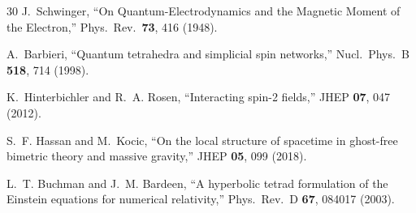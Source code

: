 \documentclass[aps,prd,preprint,superscriptaddress,showpacs,preprintnumbers,amsmath,amssymb,nofootinbib]{revtex4-2}
\begin{document}
\begin{thebibliography}{30}
J.~Schwinger, ``On Quantum-Electrodynamics and the Magnetic Moment of the Electron,'' Phys.\ Rev.\ \textbf{73}, 416 (1948).

A.~Barbieri, ``Quantum tetrahedra and simplicial spin networks,'' Nucl.\ Phys.\ B \textbf{518}, 714 (1998).

K.~Hinterbichler and R.~A. Rosen, ``Interacting spin-2 fields,'' JHEP \textbf{07}, 047 (2012).

S.~F. Hassan and M.~Kocic, ``On the local structure of spacetime in ghost-free bimetric theory and massive gravity,'' JHEP \textbf{05}, 099 (2018).

L.~T. Buchman and J.~M. Bardeen, ``A hyperbolic tetrad formulation of the Einstein equations for numerical relativity,'' Phys.\ Rev.\ D \textbf{67}, 084017 (2003).

\end{thebibliography}
\end{document}
